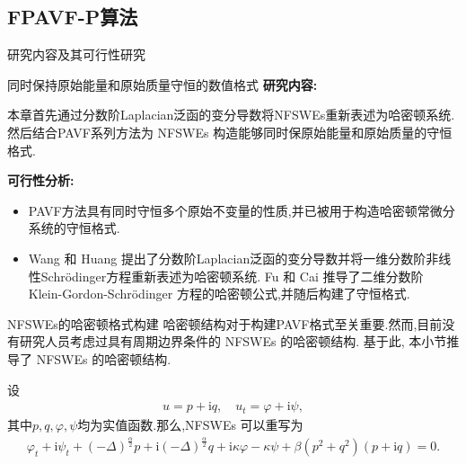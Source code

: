 \documentclass[aspectratio=169]{beamer}
\numberwithin{theorem}{section} %
\numberwithin{equation}{section}%
\numberwithin{figure}{section}%
\numberwithin{table}{section}%
\begin{document}
\subsection{FPAVF-P算法}
\begin{frame}{研究内容及其可行性研究}
	\begin{block}{同时保持原始能量和原始质量守恒的数值格式}
		\textbf{\textcolor[rgb]{0.227,0.373,0.306}{研究内容:}}
		
		{\footnotesize 本章首先通过分数阶Laplacian泛函的变分导数将NFSWEs重新表述为哈密顿系统.然后结合PAVF系列方法为 NFSWEs 构造能够同时保原始能量和原始质量的守恒格式.}
		
		\textbf{\textcolor[rgb]{0.227,0.373,0.306}{可行性分析:}}
		\begin{itemize}
			\item {\footnotesize PAVF方法具有同时守恒多个原始不变量的性质,并已被用于构造哈密顿常微分系统的守恒格式\cite{caiPartitionedAveragedVector2018}.​​​​​​​​​​​​​​​​​​​​​​​​​​​​​​​​​​​​​​​​​​​​​​​​​​​​​​​​​​​​​​​​​​​​​​​​​​​​​​​​​​​​​​​​​​​​​​​​​​​​​​​​​​​​​​​​​​​​​​​​​​​​​​​​​​​​​​​​​​​​​​​​​​​​​​​​​​​​​​​​​​​​​​​​​​​​​​​​​​​​​​​​​​​​​​​​​​​​​​​​​​​​​​​​​​​​​​​​​​​​​​​​​​​​​​​​​​​​​​​​​​​​​​​​​​​​​​​​​​​​​​​​​​​​​​​​​​​​​​​​​​​​​​​​​​​​​​​​​​​​​​​​​​​​​​​​​​​​​​​​​​}
			\item {\footnotesize Wang 和 Huang \cite{wangStructurepreservingNumericalMethods2018} 提出了分数阶Laplacian泛函的变分导数并将一维分数阶非线性Schrödinger方程重新表述为哈密顿系统.
			Fu 和 Cai \cite{fuStructurepreservingAlgorithmsTwodimensional2020} 推导了二维分数阶 Klein-Gordon-Schrödinger 方程的哈密顿公式,并随后构建了守恒格式.}
			\end{itemize}
	\end{block}
	\end{frame}

\begin{frame}{NFSWEs的哈密顿格式构建}
	哈密顿结构对于构建PAVF格式至关重要.然而,目前没有研究人员考虑过具有周期边界条件的 NFSWEs 的哈密顿结构.
	基于此, 本小节推导了 NFSWEs 的哈密顿结构.
	
	设
	\begin{align}
	u = p+\mathrm{i}q, \quad u_t = \varphi+ \mathrm{i}\psi,
	\end{align}
	其中$p, q,\varphi,\psi$均为实值函数.那么,NFSWEs  可以重写为
	\begin{align}\label{eq_PAVF:28}
	\varphi_{t}+\mathrm{i}\psi_{t}+\left( -\Delta \right) ^{\frac{\alpha }{2}}p+\mathrm{i}\left( -\Delta \right) ^{\frac{\alpha }{2}}q+\mathrm{i}\kappa \varphi-\kappa \psi+\beta \left( p^{2}+q^{2}\right) \left( p+\mathrm{i} q\right) =0.
	\end{align}
	\end{frame}
\end{document}
